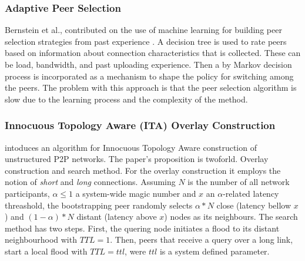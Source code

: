 %
%


\subsubsection{Adaptive Peer Selection}
Bernstein et al., contributed on the use of machine learning for building peer
selection strategies from past experience \cite{bflz_adaptpeersel_2003}. A
decision tree is used to rate peers based on information about connection
characteristics that is collected. These can be load, bandwidth, and past
uploading experience. Then a by Markov decision process is incorporated as a
mechanism to shape the policy for switching among the peers. The problem
with this approach is that the peer selection algorithm is slow due to the
learning process and the complexity of the method.

\subsubsection{Innocuous Topology Aware (ITA) Overlay Construction}
\cite{prfm_ita_2009} intoduces an algorithm for Innocuous Topology Aware
construction of unstructured P2P networks. The paper's proposition is twoforld.
Overlay construction and search method. For the overlay construction it employs
the notion of \emph{short} and \emph{long} connections. Assuming $N$ is the
number of all network participants, $\alpha \leq 1 $ a system-wide magic number
and $x$ an $\alpha$-related latency threashold, the bootstrapping peer randomly
selects $\alpha \ast N$ close (latency bellow $x$) and
$\left( 1 - \alpha \right) \ast N$ distant (latency above $x$) nodes as its
neighbours. The search method has two steps. First, the quering node initiates a
flood to its distant neighbourhood with $TTL = 1$. Then, peers that receive a
query over a long link, start a local flood with $TTL = ttl$, were $ttl$ is a
system defined parameter.


